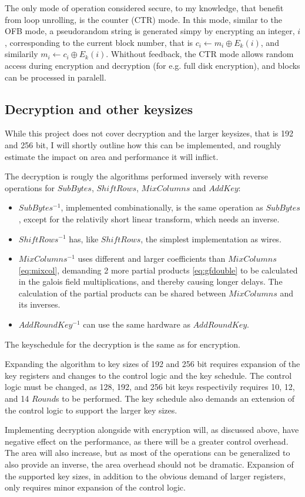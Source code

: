 The only mode of operation considered secure, to my knowledge, that
benefit from loop unrolling, is the counter (CTR) mode. In this mode,
similar to the OFB mode, a pseudorandom string is generated simpy by
encrypting an integer, $i$, corresponding to the current block number, that
is $c_i \leftarrow m_i \oplus E_k(i)$, and similarily $m_i \leftarrow
c_i \oplus E_k(i)$. Whithout feedback, the CTR mode allows random
access during encryption and decryption (for e.g. full disk
encryption), and blocks can be processed in paralell.

\subsection{Decryption and other keysizes}

While this project does not cover decryption and the larger keysizes,
that is 192 and 256 bit, I will shortly outline how this can be
implemented, and roughly estimate the impact on area and performance
it will inflict.

The decryption is rougly the algorithms performed inversely with
reverse operations for $SubBytes$, $ShiftRows$, $MixColumns$ and
$AddKey$: 
\begin{itemize}
  \item $SubBytes^{-1}$, implemented combinationally, is the same
    operation as $SubBytes$, except for the relativily short linear
    transform, which needs an inverse. 
  \item $ShiftRows^{-1}$ has, like $ShiftRows$, the simplest
    implementation as wires. 
  \item $MixColumns^{-1}$ uses different and larger coefficients
    than $MixColumns$ \eqref{eq:mixcol}, demanding 2 more partial
    products \eqref{eq:gfdouble} to be calculated in the
    galois field multiplications, and thereby causing longer
    delays. The calculation of the partial products can be shared
    between $MixColumns$ and its inverses. 
  \item $AddRoundKey^{-1}$ can use the same hardware as
    $AddRoundKey$. 
\end{itemize}
The keyschedule for the decryption is the same as for encryption.

Expanding the algorithm to key sizes of 192 and 256 bit requires
expansion of the key registers and changes to the control logic and
the key schedule. The control logic must be changed, as 128, 192, and
256 bit keys respectivily requires 10, 12, and 14 $Round$s to be
performed. The key schedule also demands an extension of the control
logic to support the larger key sizes.

Implementing decryption alongside with encryption will, as discussed
above, have negative effect on the performance, as there will be a
greater control overhead. The area will also increase, but as most of
the operations can be generalized to also provide an inverse, the area
overhead should not be dramatic. Expansion of the supported key sizes,
in addition to the obvious demand of larger registers, only requires
minor expansion of the control logic.

